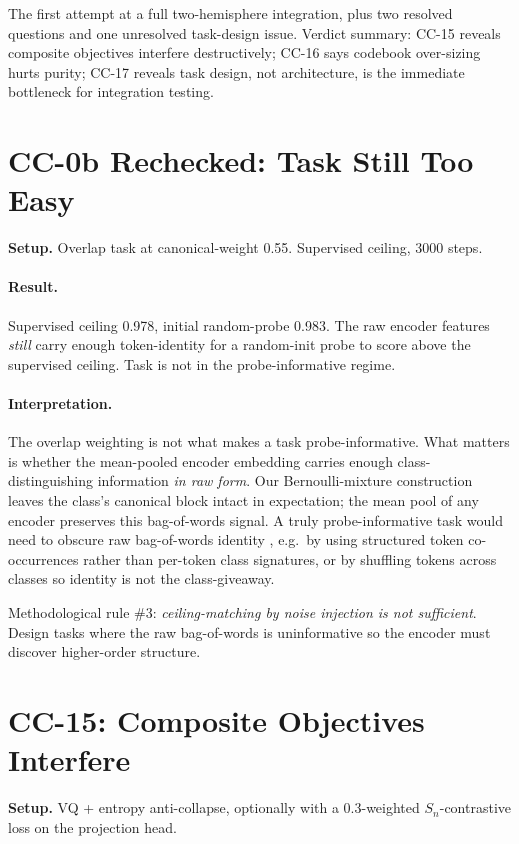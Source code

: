 \documentclass[10pt, twocolumn, a4paper]{article}
\newcommand{\Sn}{S_n}
\begin{document}
The first attempt at a full two-hemisphere integration, plus two resolved questions and one unresolved task-design issue. Verdict summary: CC-15 reveals composite objectives interfere destructively; CC-16 says codebook over-sizing hurts purity; CC-17 reveals task design, not architecture, is the immediate bottleneck for integration testing.

\section{CC-0b Rechecked: Task Still Too Easy}

\textbf{Setup.} Overlap task at canonical-weight 0.55. Supervised ceiling, 3000 steps.

\paragraph{Result.} Supervised ceiling 0.978, initial random-probe 0.983. The raw encoder features \emph{still} carry enough token-identity for a random-init probe to score above the supervised ceiling. Task is not in the probe-informative regime.

\paragraph{Interpretation.} The overlap weighting is not what makes a task probe-informative. What matters is whether the mean-pooled encoder embedding carries enough class-distinguishing information \emph{in raw form}. Our Bernoulli-mixture construction leaves the class's canonical block intact in expectation; the mean pool of any encoder preserves this bag-of-words signal. A truly probe-informative task would need to obscure raw bag-of-words identity ,  e.g.\ by using structured token co-occurrences rather than per-token class signatures, or by shuffling tokens across classes so identity is not the class-giveaway.

Methodological rule \#3: \emph{ceiling-matching by noise injection is not sufficient}. Design tasks where the raw bag-of-words is uninformative so the encoder must discover higher-order structure.

\section{CC-15: Composite Objectives Interfere}

\textbf{Setup.} VQ + entropy anti-collapse, optionally with a 0.3-weighted $\Sn$-contrastive loss on the projection head.
\end{document}
